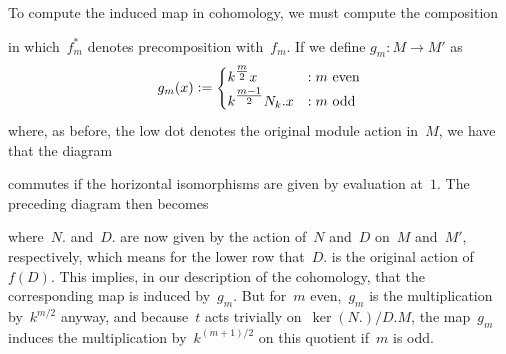 \documentclass[12pt]{article}
\makeatletter
\theoremstyle{definition}
\theoremstyle{break}
\renewenvironment{proof}[1][\proofname]{\par
\vspace{-5pt}%
\pushQED{\qed}%
\normalfont
\topsep0pt \partopsep0pt %
\trivlist
\item[\hskip\labelsep
\bfseries
#1\@addpunct{.}]\ignorespaces
}{%
\popQED\endtrivlist\@endpefalse
\addvspace{6pt plus 6pt} %
}
\DeclareMathOperator\Hom{Hom}
\DeclareMathOperator\id{id}
\renewcommand{\1}{\mathbbm{1}}
\newcommand{\deq}{\vcentcolon =}
\makeatother
\begin{document}
\begin{proof}
To compute the induced map in cohomology, we must compute the composition
\begin{center}
\end{center}
in which~$f_m^*$ denotes precomposition with~$f_m$. If we define $g_m \colon M \to M'$ as
\[g_m(x) \deq
\begin{cases}
k^{\tfrac{m}{2}} x &: m \text{ even}\\
k^{\tfrac{m-1}{2}} N_k.x &: m \text{ odd}
\end{cases}\]
where, as before, the low dot denotes the original module action in~$M$, we have that the diagram
\begin{center}
\end{center}
commutes if the horizontal isomorphisms are given by evaluation at~$1$. The preceding diagram then becomes
\begin{center}
\end{center}
where~$N.$ and~$D.$ are now given by the action of~$N$ and~$D$ on~$M$ and~$M'$, respectively, which means for the lower row that~$D.$ is the original action of~$f(D)$. This implies, in our description of the cohomology, that the corresponding map is induced by~$g_m$. But for~$m$ even,~$g_m$ is the multiplication by~$k^{m/2}$ anyway, and because~$t$ acts trivially on~$\ker(N.)/D.M$, the map~$g_m$ induces the multiplication by~$k^{(m+1)/2}$ on this quotient if~$m$ is odd.
\end{proof}
\end{document}
